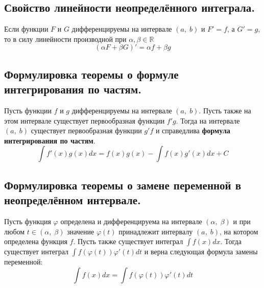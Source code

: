 

\label{sec_Definition21}
\begin{definition}
    \subsection*{Свойство линейности неопределённого интеграла. }
    \begin{note}[purple]
        Если функции $F$ и $G$ дифференцируемы на интервале $(a, \; b)$ и $F' = f$,
        а $G' = g$, то в силу линейности производной при $\alpha, \beta \in \mathbb{R}$
        $$ (\alpha F + \beta G)' = \alpha f + \beta g $$
    \end{note}

    \subsection*{Формулировка теоремы о формуле интегрирования по частям.}
    \begin{note}[purple]
        Пусть функции $f$ и $g$ дифференцируемы на интервале $(a, \; b)$. Пусть также
        на этом интервале существует первообразная функции $f'g$. Тогда на интервале $(a, \; b)$
        существует первообразная функции $g'f$ и справедлива \textbf{формула интегрирования 
        по частям}. 
        $$ \int f'(x)g(x)dx = f(x)g(x) - \int f(x)g'(x)dx + C $$
    \end{note}

    \subsection*{Формулировка теоремы о замене переменной в неопределённом интервале.}
    \begin{note}[purple]
        Пусть функция $\varphi$ определена и дифференцируема на интервале $(\alpha, \; \beta)$
        и при любом $t \in (\alpha, \; \beta)$ значение $\varphi(t)$ принадлежит интервалу
        $(a, \; b)$, на котором определена функция $f$. Пусть также существует интеграл 
        $\int f(x)dx$. Тогда существует интеграл $\int f(\varphi(t)) \varphi'(t) dt$ и
        верна следующая формула замены переменной:
        $$ \int f(x)dx = \int f(\varphi(t)) \varphi'(t) dt $$
    \end{note}
\end{definition}